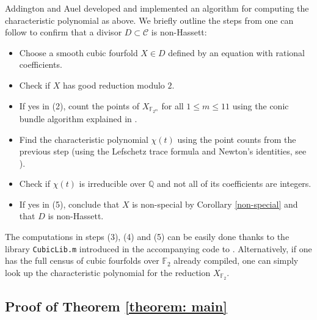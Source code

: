 \documentclass[12pt]{amsart}
\numberwithin{equation}{section}
\theoremstyle{plain}
\theoremstyle{remark}
\theoremstyle{definition}
\newcommand{\bQ}{\mathbb{Q}}
\newcommand{\bF}{\mathbb{F}}
\newcommand{\calC}{\mathcal{C}}
\begin{document}
Addington and Auel developed and implemented an algorithm \cite[Section 3]{AA} for computing the characteristic polynomial as above.
We briefly outline the steps from \cite{AA} one can follow to confirm that a divisor $D\subset\calC$ is non-Hassett:
\begin{itemize}
    \item[(1)] Choose a smooth cubic fourfold $X\in D$ defined by an equation with rational coefficients.
    \item[(2)] Check if $X$ has good reduction modulo $2$.
    \item[(3)] If yes in (2), count the points of $X_{\bF_{2^m}}$ for all $1\leq m\leq 11$ using the conic bundle algorithm explained in \cite[Section 3]{AA}.
    \item[(4)] Find the characteristic polynomial $\chi(t)$ using the point counts from the previous step (using the Lefschetz trace formula and Newton's identities, see \cite[Section 2]{AA}).
    \item[(5)] Check if $\chi(t)$ is irreducible over $\bQ$ and not all of its coefficients are integers.
    \item[(6)] If yes in (5), conclude that $X$ is non-special by Corollary \ref{non-special} and that $D$ is non-Hassett.
\end{itemize}
The computations in steps (3), (4) and (5) can be easily done thanks to the library \verb|CubicLib.m| introduced in the accompanying code \cite{F2code} to \cite{AKPW}. Alternatively, if one has the full census of cubic fourfolds over $\bF_2$ already compiled, one can simply look up the characteristic polynomial for the reduction $X_{\bF_2}.$

\subsection{Proof of Theorem \ref{theorem: main}} \label{section proof: main}
\end{document}
